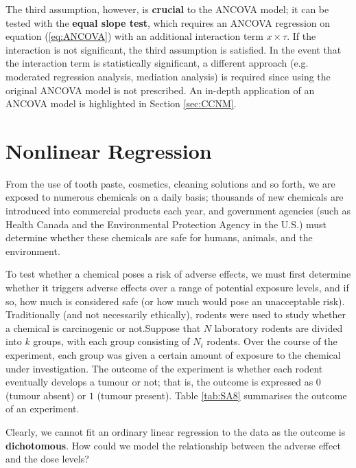 \par The third assumption, however, is \textbf{crucial} to the ANCOVA model; it can be tested with the \textbf{equal slope test}, which requires an ANCOVA regression on equation (\ref{eq:ANCOVA}) with an additional interaction term $x \times \tau$. If the interaction is not significant, the third assumption is satisfied. In the event that the interaction term is statistically significant, a different approach (e.g. moderated regression analysis, mediation analysis) is required since using the original ANCOVA model is not prescribed. An in-depth application of an ANCOVA model is highlighted in Section \ref{sec:CCNM}.


\section{Nonlinear Regression}
From the use of tooth paste, cosmetics, cleaning solutions and so forth, we are exposed to numerous chemicals on a daily basis; thousands of new chemicals are introduced into commercial products each year, and government agencies (such as Health Canada and the Environmental Protection Agency in the U.S.) must determine whether these chemicals are safe for humans, animals, and the environment. \par To test whether a chemical poses a risk of adverse effects, we must first determine whether it triggers adverse effects over a range of potential exposure levels, and if so, how much is considered safe (or how much would pose an unacceptable risk). Traditionally (and not necessarily ethically), rodents were used to study whether a chemical is carcinogenic or not.\newl  Suppose that $N$ laboratory rodents are divided into $k$ groups, with each group consisting of $N_{i}$ rodents. Over the course of the experiment, each group was given a certain amount of exposure to the chemical under investigation. The outcome of the experiment is whether each rodent eventually develops a tumour or not; that is, the outcome is expressed as $0$ (tumour absent) or $1$ (tumour present). Table \ref{tab:SA8} summarises the outcome of an experiment. \par Clearly, we cannot fit an ordinary linear regression to the data as the outcome is \textbf{dichotomous}. How could we model the relationship between the adverse effect and the dose levels?

